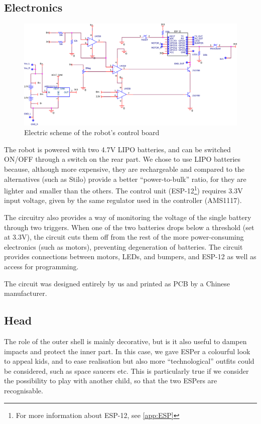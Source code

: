 \documentclass[a4paper,twoside]{book}
\begin{document}
\subsection{Electronics}

\begin{figure}[h]
\includegraphics[width=\textwidth]{img/ProgettoCircuito}
\caption{Electric scheme of the robot's control board}
\label{fig:robot_circ}
\end{figure}

The robot is powered with two 4.7V LIPO batteries, and can be switched ON/OFF through a switch on the rear part. We chose to use LIPO batteries because, although more expensive, they are rechargeable and \textemdash{} compared to the alternatives (such as Stilo) \textemdash{} provide a better \textquotedblleft{}power-to-bulk\textquotedblright{}  ratio, for they are lighter and smaller than the others.
The control unit (ESP-12\footnote{For more information about ESP-12, see \autoref{app:ESP}}) requires 3.3V input voltage, given by the same regulator used in the controller (AMS1117).

The circuitry also provides a way of monitoring the voltage of the single battery through two triggers. When one of the two batteries drops below a threshold (set at 3.3V), the circuit cuts them off from the rest of the more power-consuming electronics (such as motors), preventing degeneration of batteries. The circuit provides connections between motors, LEDs, and bumpers, and ESP-12 as well as access for programming.

The circuit was designed entirely by us and printed as PCB by a Chinese manufacturer.

\subsection{Head}

The role of the outer shell is mainly decorative, but is it also useful to dampen impacts and protect the inner part. In this case, we gave ESPer a colourful look to appeal kids, and to ease realisation but also more \textquotedblleft{}technological\textquotedblright{} outfits could be considered, such as space saucers etc. This is particularly true if we consider the possibility to play with another child, so that the two ESPers are recognisable.
\end{document}
